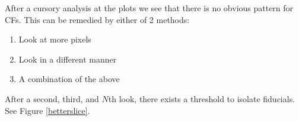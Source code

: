 \documentclass[10pt]{scrartcl}
\begin{document}
After a cursory analysis at the plots we see that there is no obvious pattern for CFs. This can be remedied by either of 2 methods:

\begin{enumerate}
    \item Look at more pixels
    \item Look in a different manner
    \item A combination of the above
\end{enumerate}

After a second, third, and $N$th look, there exists a threshold to isolate fiducials. See Figure \ref{betterslice}.\\

\begin{figure}[!ht]


\end{figure}
\end{document}
